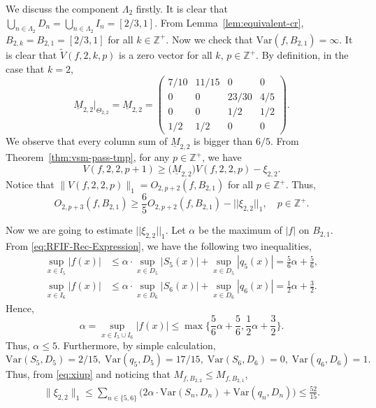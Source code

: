 \documentclass[11pt]{amsart}
\theoremstyle{definition}
\theoremstyle{remark}
\numberwithin{equation}{section}
\newcommand{\Z}{{\mathbb Z}}
\newcommand{\blue}{\color{blue}}
\newcommand{\lowM}{{\underline{M}}}
\newcommand{\Var}{\mathrm{Var}}
\def\wdt{\widetilde}
\begin{document}
	
	We discuss the component $\Lambda_2$ firstly. It is clear that $\bigcup_{n\in \Lambda_2} D_n=\bigcup_{n\in \Lambda_2} I_n=[2/3,1]$. From Lemma~\ref{lem:equivalent-cr}, $ B_{2,k}=B_{2,1}=[2/3,1]$ for all $k \in \Z^+$. 
	Now we check that $\Var(f,B_{2,1})=\infty$.
	It is clear that $\wdt{V}(f,2,k,p)$ is a zero vector for all $k , \, p \in \mathbb{Z}^+$.	
	By definition, in the case that $k=2$, 
	\[
	\lowM_{2,2}|_{\Theta_{2,2}}=\lowM_{2,2}=
	\begin{pmatrix}
		7/10 & 11 /15  & 0 & 0 \\
		0 & 0 & 23/30  & 4/5 \\
		0 & 0 & 1/2 & 1/2 \\
		1/2 & 1/2 & 0 & 0 
	\end{pmatrix}.
	\]
	We observe that every column sum of $\lowM_{2,2}$ is bigger than $6/5$.	
	From Theorem~\ref{thm:vsm-pass-tmp},
	for any $p \in \mathbb{Z}^+$, we have
	\[
	V(f,2,2,p+1) %
	\geq \big(\lowM_{2,2}\big) V(f,2,2,p)  -\xi_{2,2}.
	\]
		Notice that $\lVert V(f,2,2,p)\rVert_1=O_{2,p+2}(f,B_{2,1})$ for all $ p \in \Z^+$.	Thus,
	\begin{equation}\label{eq:exam-pass}
		O_{2,p+3}(f,B_{2,1}) \geq \frac{6}{5} O_{2,p+2}(f,B_{2,1})  -||\xi_{2,2}||_1, \quad  p \in \Z^+.
	\end{equation}

	Now we are going to estimate $||\xi_{2,2}||_1$.
	Let $\alpha$ be the maximum of $|f|$ on $B_{2,1}$.
	From \eqref{eq:RFIF-Rec-Expression}, we have the following two inequalities,
	\begin{align*}
	\sup\limits_{x \in I_5}|f(x)|  
	&\leq \alpha \cdot \sup\limits_{x \in D_5} |S_5(x)| +  \sup\limits_{x \in D_5 } |q_5(x)| = \frac{5}{6} \alpha+\frac{5}{6}, \\
	\sup\limits_{x \in I_6}|f(x)| 
	&\leq \alpha \cdot \sup\limits_{x \in D_6 } |S_6(x)| + \sup\limits_{x \in D_6 } |q_6(x)| = \frac{1}{2} \alpha +\frac{3}{2}.
	\end{align*}
	Hence, 
	$$
		\alpha =\sup\limits_{x \in I_5 \cup I_6}|f(x)|   \leq  \max \Big\{\frac{5}{6} \alpha+\frac{5}{6}, \frac{1}{2} \alpha +\frac{3}{2} \Big\}.
	$$
	Thus, $\alpha \leq 5$. Furthermore, by simple calculation, 
	\[
	\Var(S_5,D_5)={2}/{15}, \; \Var(q_5,D_5)={17}/{15}, \; \Var(S_6,D_6)=0, \; \Var(q_6,D_6)=1.
	\]
	Thus, from \eqref{eq:xiup} and noticing that $M_{f,B_{2,2}}\leq M_{f,B_{2,1}}$,
	\begin{align*}
		\lVert\xi_{2,2}\rVert_1
		\leq \sum_{n \in \{5,6\}} \Big(2 \alpha \cdot\Var(S_n,D_n) +\Var(q_n,D_n) \Big) \leq \frac{52}{15}.
	\end{align*}
\end{document}
